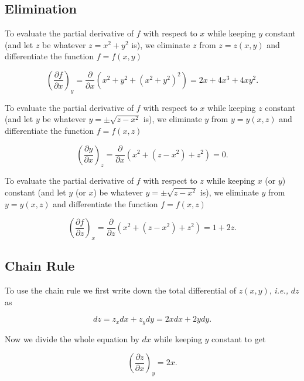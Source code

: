 \documentclass[english,a4paper,12pt]{report}
\begin{document}
\subsection{Elimination}

To evaluate the partial derivative of \(f\) with respect to \(x\) while keeping \(y\) constant (and let \(z\) be whatever \(z = x^2+y^2\) is), we eliminate \(z\) from \(z = z(x,y)\) and differentiate the function \(f=f(x,y)\)  

\begin{equation}
	\left( \frac{\partial f}{\partial x}  \right)_{y} = \frac{\partial }{\partial x} (x^2+y^2+(x^2+y^2)^2) = 2x+4x^3 +4xy^2.  
\end{equation}

To evaluate the partial derivative of \(f\) with respect to \(x\) while keeping \(z\) constant (and let \(y\) be whatever \(y = \pm \sqrt{z-x^2} \) is), we eliminate \(y\) from \(y = y(x,z)\) and differentiate the function \(f=f(x,z)\) 

\begin{equation}
	\left( \frac{\partial y}{\partial x} \right)_{z} = \frac{\partial }{\partial x}(x^2+(z-x^2)+z^2) = 0.
\end{equation}


To evaluate the partial derivative of \(f\) with respect to \(z\) while keeping \(x\) (or \(y\)) constant (and let \(y\) (or \(x\)) be whatever \(y = \pm \sqrt{z-x^2} \) is), we eliminate \(y\) from \(y = y(x,z)\) and differentiate the function \(f = f(x,z)\)

\begin{equation}
	\left( \frac{\partial f}{\partial z} \right)_{x} = \frac{\partial }{\partial z} (x^2+(z-x^2)+z^2) = 1+2z. 
\end{equation}

\subsection{Chain Rule}

To use the chain rule we first write down the total differential of \(z(x,y)\), \textit{i.e.,} \(dz\) as

\begin{equation}
	dz = z_{x} dx + z_{y} dy = 2x dx + 2ydy.   
\end{equation}

Now we divide the whole equation by \(dx\) while keeping \(y\) constant to get 

\begin{equation}
	\left( \frac{\partial z}{\partial x} \right)_{y} = 2x.
\end{equation}
\end{document}
